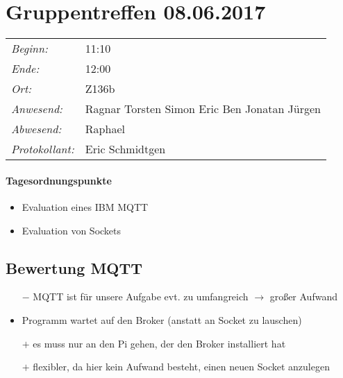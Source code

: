 \documentclass{scrartcl}
\date{08.06.2017}	%
\begin{document}
\maketitle
\section{Gruppentreffen 08.06.2017}	%
\begin{tabular}[t]{p{.25\linewidth} p{.25\linewidth}}
\emph{Beginn:}				& 11:10\\
\emph{Ende:}					& 12:00\\
\emph{Ort:}						& Z136b\\
\emph{Anwesend:}	& 
Ragnar\newline
Torsten\newline
Simon\newline
Eric\newline
Ben\newline
Jonatan\newline
Jürgen
\\
\emph{Abwesend:}		 & 
Raphael 
\\
\emph{Protokollant:}& Eric Schmidtgen
\end{tabular}
\paragraph{Tagesordnungspunkte}
\begin{itemize}
\item Evaluation eines IBM MQTT
\item Evaluation von Sockets 
\end{itemize}

\subsection{Bewertung MQTT}
\begin{itemize}
\item[$-$] MQTT ist für unsere Aufgabe evt. zu umfangreich $\to$ großer Aufwand
\item Programm wartet auf den Broker (anstatt an Socket zu lauschen)
\item[$+$] es muss nur an den Pi gehen, der den Broker installiert hat
\item[$+$] flexibler, da hier kein Aufwand besteht, einen neuen Socket anzulegen
\end{itemize}
\end{document}
